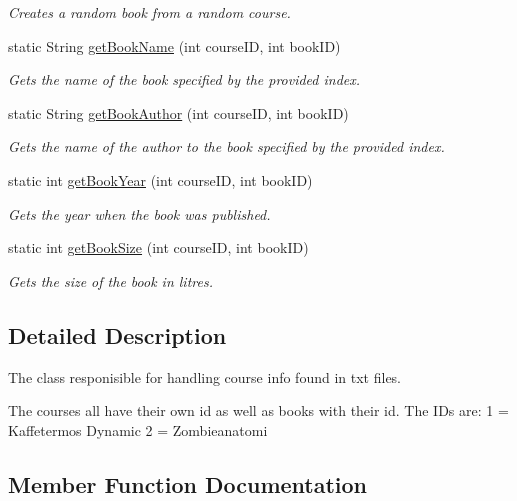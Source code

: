 \begin{DoxyCompactItemize}
\begin{DoxyCompactList}\small\item\em Creates a random book from a random course. \end{DoxyCompactList}\item 
static String \hyperlink{classTXTReader_a59c8c95a6436b27076bc57c123db3c63}{get\+Book\+Name} (int course\+I\+D, int book\+I\+D)
\begin{DoxyCompactList}\small\item\em Gets the name of the book specified by the provided index. \end{DoxyCompactList}\item 
static String \hyperlink{classTXTReader_a595b7f527438b44072b25de0410170fd}{get\+Book\+Author} (int course\+I\+D, int book\+I\+D)
\begin{DoxyCompactList}\small\item\em Gets the name of the author to the book specified by the provided index. \end{DoxyCompactList}\item 
static int \hyperlink{classTXTReader_aaca34258d8e4a8370e5bb58b497bb8bc}{get\+Book\+Year} (int course\+I\+D, int book\+I\+D)
\begin{DoxyCompactList}\small\item\em Gets the year when the book was published. \end{DoxyCompactList}\item 
static int \hyperlink{classTXTReader_a5c3b8e4474da76fcf6cfe46434c71d29}{get\+Book\+Size} (int course\+I\+D, int book\+I\+D)
\begin{DoxyCompactList}\small\item\em Gets the size of the book in litres. \end{DoxyCompactList}\end{DoxyCompactItemize}


\subsection{Detailed Description}
The class responisible for handling course info found in txt files. 

The courses all have their own id as well as books with their id. The I\+Ds are\+: 1 = Kaffetermos Dynamic 2 = Zombieanatomi 

\subsection{Member Function Documentation}
\hypertarget{classTXTReader_a595b7f527438b44072b25de0410170fd}{}
